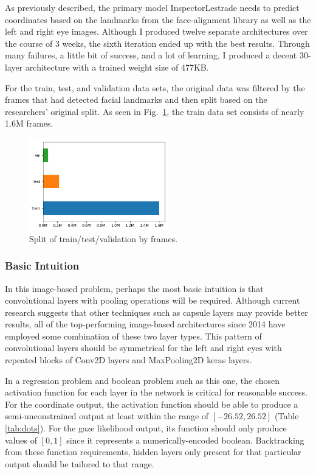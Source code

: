 \documentclass[aip, rsi, amsmath, amssymb, reprint, author-year, longbibliography]{revtex4-1}
\begin{document}
As previously described, the primary model InspectorLestrade needs to predict
coordinates based on the landmarks from the face-alignment library as well as
the left and right eye images. Although I produced twelve separate architectures
over the course of 3 weeks, the sixth iteration ended up with the best results.
Through many failures, a little bit of success, and a lot of learning, I
produced a decent 30-layer architecture with a trained weight size of 477KB.

For the train, test, and validation data sets, the original data was filtered by
the frames that had detected facial landmarks and then split based on the
researchers' original split. As seen in Fig.~\ref{fig:tvtsplit}, the train data
set consists of nearly 1.6M frames.

\begin{figure}[h]
\includegraphics[height=4cm]{train-val-test-split.png}
\caption{\label{fig:tvtsplit} Split of train/test/validation by frames.}
\end{figure}

\subsubsection{\label{sec:level3} Basic Intuition}

In this image-based problem, perhaps the most basic intuition is that
convolutional layers with pooling operations will be required. Although current
research suggests that other techniques such as capsule layers may provide
better results, all of the top-performing image-based architectures since 2014
have employed some combination of these two layer types. This pattern of
convolutional layers should be symmetrical for the left and right eyes with
repeated blocks of Conv2D layers and MaxPooling2D keras layers.

In a regression problem and boolean problem such as this one, the chosen
activation function for each layer in the network is critical for reasonable
success. For the coordinate output, the activation function should be able to
produce a semi-unconstrained output at least within the range of $[-26.52,
26.52]$ (Table \ref{tab:dots}). For the gaze likelihood output, its function
should only produce values of $[0, 1]$ since it represents a numerically-encoded
boolean. Backtracking from these function requirements, hidden layers only
present for that particular output should be tailored to that range.
\end{document}
